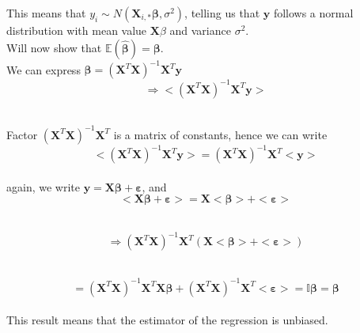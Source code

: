 \documentclass[reprint,english,notitlepage]{revtex4-1}  %
\begin{document}
    This means that $y_i \sim N(\mathbf{X}_{i,*}\boldsymbol{\beta}, \sigma^2)$, telling us that $\mathbf{y}$ follows a normal distribution with mean value $\mathbf{X} \beta$ and variance $\sigma^2$. \\

    Will now show that $\mathbb{E}(\boldsymbol{\hat{\beta}}) = \boldsymbol{\beta}$. \\

    We can express $\boldsymbol{\beta} = (\mathbf{X}^T\mathbf{X})^{-1}\mathbf{X}^T \mathbf{y}$ \\ $$\Rightarrow  <(\mathbf{X}^T\mathbf{X})^{-1}\mathbf{X}^T \mathbf{y}>$$ \\

    \vspace{-5pt}
    
    Factor $(\mathbf{X}^T\mathbf{X})^{-1}\mathbf{X}^T$ is a matrix of constants, hence we can write \\

    
    
    $$<(\mathbf{X}^T\mathbf{X})^{-1}\mathbf{X}^T \mathbf{y}> = (\mathbf{X}^T\mathbf{X})^{-1}\mathbf{X}^T< \mathbf{y}>$$ \\

    

    again, we write $\mathbf{y} = \mathbf{X} \boldsymbol{\beta} + \boldsymbol{\varepsilon}$, and  \\ $$<\mathbf{X} \boldsymbol{\beta} + \boldsymbol{\varepsilon}> = \mathbf{X}< \boldsymbol{\beta}> + <\boldsymbol{\varepsilon}>$$ \\

    \vspace{-40pt}

    \[ \Rightarrow (\mathbf{X}^T\mathbf{X})^{-1}\mathbf{X}^T (\mathbf{X}< \boldsymbol{\beta}> + <\boldsymbol{\varepsilon}>) \] \\

    \vspace{-40pt}

    \[ = (\mathbf{X}^T\mathbf{X})^{-1}\mathbf{X}^T \mathbf{X}\boldsymbol{\beta} + (\mathbf{X}^T\mathbf{X})^{-1}\mathbf{X}^T <\boldsymbol{\varepsilon}> = \mathbb{I} \boldsymbol{\beta} = \boldsymbol{\beta} \] \\



    
    This result means that the estimator of the regression is unbiased. \\
\end{document}
